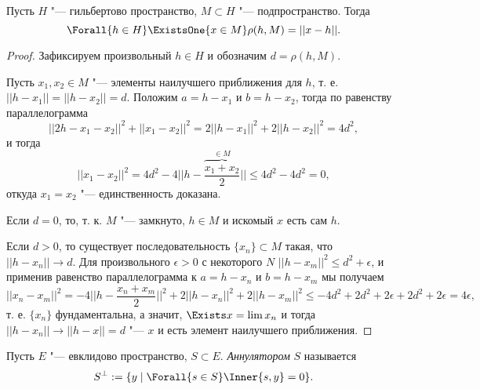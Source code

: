 \documentclass[main]{subfiles}
\begin{document}
\begin{lemma}
  Пусть \( H \) "--- гильбертово пространство, \( M \subset H \) "---
  подпространство. Тогда
  \[ \Forall{h \in H} \ExistsOne{x \in M} \rho(h, M) = ||x - h||. \]
\end{lemma}
\begin{proof}
  Зафиксируем произвольный \( h \in H \) и обозначим \( d = \rho(h, M) \).

  Пусть \( x_1, x_2 \in M \) "---
  элементы наилучшего приближения для \( h \),
  т. е.  \( ||h - x_1|| = ||h - x_2|| = d \).
  Положим \( a = h - x_1 \) и \( b = h - x_2 \),
  тогда по равенству параллелограмма
  \[ ||2h - x_1 - x_2||^2 + ||x_1 - x_2||^2 =
  2||h - x_1||^2 + 2 ||h - x_2||^2 = 4 d^2, \]
  и тогда
  \[ ||x_1 - x_2||^2 = 4d^2 - 4 ||h - \overbrace{\frac{x_1 + x_2}{2}}^{\in M}||
  \le 4d^2 - 4d^2 = 0, \]
  откуда \( x_1 = x_2 \) "--- единственность доказана.

  Если \( d = 0 \), то, т. к. \( M \) "--- замкнуто,
  \( h \in M \) и искомый \( x \) есть сам \( h \).

  Если \( d > 0 \), то существует последовательность
  \( \{ x_n \} \subset M \) такая, что
  \( ||h - x_n|| \to d \).  Для произвольного \( \epsilon > 0 \)
  с некоторого \( N \) \( ||h - x_m||^2 \le d^2 + \epsilon \),
  и применив равенство параллелограмма
  к \( a = h - x_n \) и \( b = h - x_m \) мы получаем
  \[
    ||x_n - x_m||^2 = -4 ||h - \frac{x_n + x_m}{2}||^2
    + 2 ||h - x_n||^2 + 2||h - x_m||^2 \le
    -4 d^2 + 2d^2 + 2\epsilon + 2d^2 + 2\epsilon =
    4 \epsilon,
  \]
  т. е. \( \{ x_n \} \) фундаментальна, а значит,
  \( \Exists x = \lim x_n \) и тогда
  \( ||h - x_n|| \to ||h - x|| = d \) "---
  \( x \) и есть элемент наилучшего приближения.
\end{proof}


\begin{definition}
  Пусть \( E \) "--- евклидово пространство, \( S \subset E \).
  \emph{Аннулятором} \( S \) называется
  \[ S^\perp := \{ y \mid \Forall{s \in S} \Inner{s, y} = 0 \}. \]
\end{definition}
\end{document}
